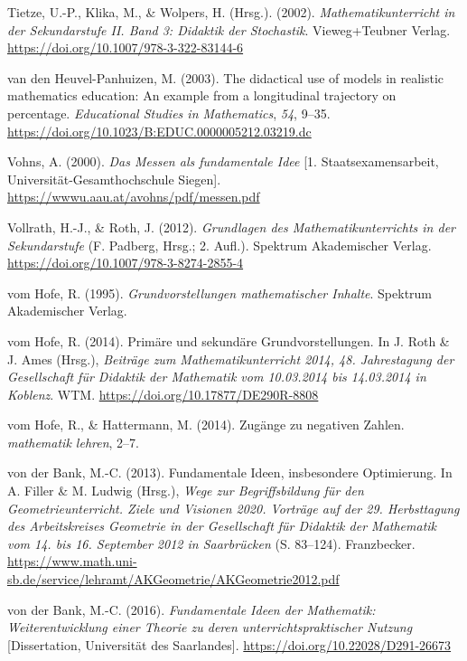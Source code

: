 \documentclass[
]{scrbook}
\newlength{\cslhangindent}
\newenvironment{CSLReferences}[2] %
 {\begin{list}{}{%
  \setlength{\itemindent}{0pt}
  \setlength{\leftmargin}{0pt}
  \setlength{\parsep}{0pt}
  \ifodd #1
   \setlength{\leftmargin}{\cslhangindent}
   \setlength{\itemindent}{-1\cslhangindent}
  \fi
  \setlength{\itemsep}{#2\baselineskip}}}
 {\end{list}}
\theoremstyle{definition}
\theoremstyle{definition}
\theoremstyle{definition}
\theoremstyle{definition}
\theoremstyle{remark}
\begin{document}
\begin{CSLReferences}{1}{0}
Tietze, U.-P., Klika, M., \& Wolpers, H. (Hrsg.). (2002). \emph{Mathematikunterricht in der {Sekundarstufe} {II}. {Band} 3: {Didaktik} der {Stochastik}}. Vieweg+Teubner Verlag. \url{https://doi.org/10.1007/978-3-322-83144-6}

van den Heuvel-Panhuizen, M. (2003). The didactical use of models in realistic mathematics education: {An} example from a longitudinal trajectory on percentage. \emph{Educational Studies in Mathematics}, \emph{54}, 9--35. \url{https://doi.org/10.1023/B:EDUC.0000005212.03219.dc}

Vohns, A. (2000). \emph{Das {Messen} als fundamentale {Idee}} {[}1. Staatsexamensarbeit, Universität-Gesamthochschule Siegen{]}. \url{https://wwwu.aau.at/avohns/pdf/messen.pdf}

Vollrath, H.-J., \& Roth, J. (2012). \emph{Grundlagen des {Mathematikunterrichts} in der {Sekundarstufe}} (F. Padberg, Hrsg.; 2. Aufl.). Spektrum Akademischer Verlag. \url{https://doi.org/10.1007/978-3-8274-2855-4}

vom Hofe, R. (1995). \emph{Grundvorstellungen mathematischer {Inhalte}}. Spektrum Akademischer Verlag.

vom Hofe, R. (2014). Primäre und sekundäre {Grundvorstellungen}. In J. Roth \& J. Ames (Hrsg.), \emph{Beiträge zum {Mathematikunterricht} 2014, 48. {Jahrestagung} der {Gesellschaft} für {Didaktik} der {Mathematik} vom 10.03.2014 bis 14.03.2014 in {Koblenz}}. WTM. \url{https://doi.org/10.17877/DE290R-8808}

vom Hofe, R., \& Hattermann, M. (2014). Zugänge zu negativen {Zahlen}. \emph{mathematik lehren}, 2--7.

von der Bank, M.-C. (2013). Fundamentale {Ideen}, insbesondere {Optimierung}. In A. Filler \& M. Ludwig (Hrsg.), \emph{Wege zur {Begriffsbildung} für den {Geometrieunterricht}. {Ziele} und {Visionen} 2020. {Vorträge} auf der 29. {Herbsttagung} des {Arbeitskreises} {Geometrie} in der {Gesellschaft} für {Didaktik} der {Mathematik} vom 14. bis 16. {September} 2012 in {Saarbrücken}} (S. 83--124). Franzbecker. \url{https://www.math.uni-sb.de/service/lehramt/AKGeometrie/AKGeometrie2012.pdf}

von der Bank, M.-C. (2016). \emph{Fundamentale {Ideen} der {Mathematik}: {Weiterentwicklung} einer {Theorie} zu deren unterrichtspraktischer {Nutzung}} {[}Dissertation, Universität des Saarlandes{]}. \url{https://doi.org/10.22028/D291-26673}


\end{CSLReferences}
\end{document}
